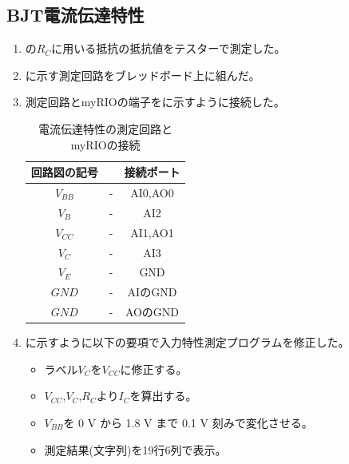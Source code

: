 \documentclass[11pt,dvipdfmx]{jarticle}
\begin{document}
	\subsection{BJT電流伝達特性}
	\label{sec:BJT電流伝達特性}
		\begin{enumerate}
			\item {}の$R_C$に用いる抵抗の抵抗値をテスターで測定した。
			\item {}に示す測定回路をブレッドボード上に組んだ。
			\item 測定回路とmyRIOの端子をに示すように接続した。
			\begin{table}[H]
				\centering
				\caption{電流伝達特性の測定回路とmyRIOの接続}
				\begin{tabular}{ccc}
				\hline
				回路図の記号 & &接続ポート \\ \hline\hline
				$V_{BB}$ & - & AI0,AO0 \\
				$V_B$ & - & AI2 \\
				$V_{CC}$ & - & AI1,AO1 \\
				$V_C$ & - & AI3 \\
				$V_E$ & - & GND \\
				$GND$ & - & AIのGND \\
				$GND$ & - & AOのGND \\
				\hline
				\end{tabular}
				\label{tab:電流伝達特性の測定回路とmyRIOの接続}
			\end{table}
			\item {}に示すように以下の要項で入力特性測定プログラムを修正した。
			\begin{itemize}
				\item ラベル$V_C$を$V_{CC}$に修正する。
				\item $V_{CC}$,$V_C$,$R_C$より$I_C$を算出する。
				\item $V_{BB}$を 0 V から 1.8 V まで 0.1 V 刻みで変化させる。
				\item 測定結果(文字列)を19行6列で表示。
			\end{itemize}
			\begin{figure}[H]
				\centering

\end{figure}
\end{enumerate}
\end{document}
